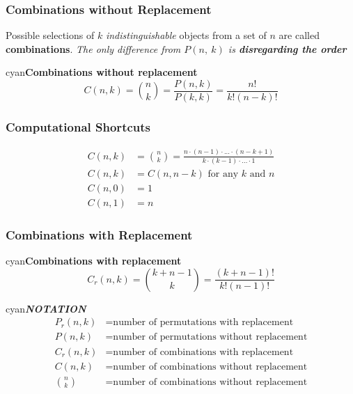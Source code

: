 \documentclass{article}
\newenvironment{formula}[1]{\begin{mybox}{cyan}{\textbf{#1}}}{\end{mybox}}
\begin{document}
\subsubsection{Combinations without Replacement}

Possible selections of $k$ \textit{indistinguishable} objects from a set of $n$ are called \textbf{combinations}. \textit{The only difference from $P(n,\ k)$ is \textbf{disregarding the order}}

\begin{formula}{Combinations without replacement}
\begin{equation*}
    C(n,k) = \binom{n}{k} = \frac{P(n,k)}{P(k,k)} = \frac{n!}{k! (n - k)!}
\end{equation*}
\end{formula}

\subsubsection{Computational Shortcuts}

\begin{align*}
    C(n,k) &= \binom{n}{k} = \frac{n \cdot (n-1) \cdot ... \cdot (n-k+1)}{k \cdot (k-1) \cdot ... \cdot 1}\\
    C(n,k) &= C(n, n-k) \text{   for any $k$ and $n$}\\
    C(n,0) &= 1\\
    C(n,1) &= n
\end{align*}

\subsubsection{Combinations with Replacement}

\begin{formula}{Combinations with replacement}
\begin{equation*}
    C_r(n,k) = \binom{k + n - 1}{k} = \frac{(k + n - 1)!}{k! (n - 1)!}
\end{equation*}
\end{formula}

\begin{formula}{\textit{NOTATION}}
\begin{align*}
    P_r(n, k) &= \text{number of permutations with replacement}\\
    P(n, k) &= \text{number of permutations without replacement}\\
    C_r(n, k) &= \text{number of combinations with replacement}\\
    C(n, k) &= \text{number of combinations without replacement}\\
    \binom{n}{k} &= \text{number of combinations without replacement}
\end{align*}
\end{formula}
\end{document}
